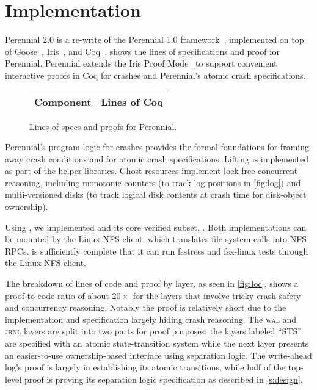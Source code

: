 \section{Implementation}
\label{s:impl}

Perennial 2.0 is a re-write of the Perennial 1.0 framework~\cite{chajed:perennial}, implemented on top of
Goose~\cite{chajed:perennial, chajed:goose-coqpl},
Iris~\cite{jung:iris-jfp,jung:iris-1}, and Coq~\cite{coq}.  
shows the lines of specifications and proof for Perennial.  Perennial extends
the Iris Proof Mode~\cite{krebbers:ipm} to support convenient interactive
proofs in Coq for crashes and Perennial's atomic crash specifications.

\begin{figure}
\centering
\small
\begin{tabular}{lr}
\toprule
\bf Component & \bf Lines of Coq \\
\midrule
  
\end{tabular}
\caption{Lines of specs and proofs for Perennial.}
\label{fig:syslines}
\end{figure}

Perennial's program logic for crashes provides the formal foundations for
framing away crash conditions and for atomic crash specifications.
Lifting is implemented as part of the helper libraries.  Ghost resources
implement lock-free concurrent reasoning, including
monotonic counters (to track log positions in \cref{fig:log}) and
multi-versioned disks (to track logical disk contents at crash time
for disk-object ownership).

Using \txn, we implemented \gnfs and its core verified subset,
\simplenfs.  Both implementations can be mounted by the
Linux NFS client, which translates file-system calls into NFS RPCs.
\gnfs is sufficiently complete that it can run fsstress and fsx-linux
tests through the Linux NFS client.

The breakdown of lines of code and proof by layer, as seen in \cref{fig:loc},
shows a proof-to-code ratio of about $20\times$ for the layers that involve
tricky crash safety and concurrency reasoning. Notably the \simplenfs proof is
relatively short due to the \txn implementation and specification largely hiding
crash reasoning. The \textsc{wal} and \textsc{jrnl} layers are split into two
parts for proof purposes; the layers labeled ``STS'' are specified with an
atomic state-transition system while the next layer presents an easier-to-use
ownership-based interface using separation logic. The write-ahead log's proof is
largely in establishing its atomic transitions, while half of the top-level \txn
proof is proving its separation logic specification as described in
\cref{s:design}.

